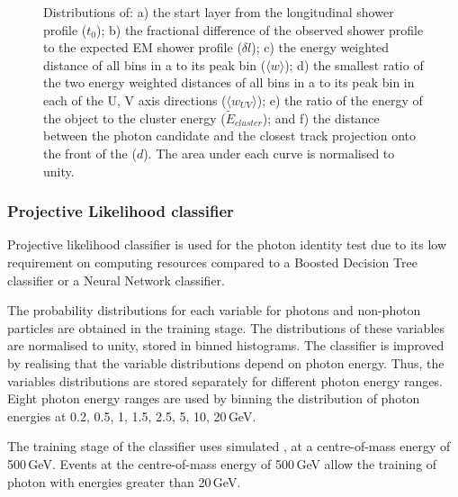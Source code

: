 \begin{figure}[tbph]
\caption
{Distributions of: a) the start layer from the longitudinal shower profile ($t_0$); b)  the fractional difference of the observed shower profile to the expected EM shower profile ($\delta{l}$); c) the energy weighted \rms distance of all bins in a \ShowerPeak to its peak bin ($\langle{w}\rangle$); d)   the smallest ratio of the two energy weighted \rms distances of all bins in a \ShowerPeak to its peak bin in each of the U, V axis directions (${\langle{w_{UV}}\rangle}$); e)  the  ratio of the energy of the \ShowerPeak object to the cluster energy ($\tilde{E}_{cluster}$); and f) the distance between the photon candidate and the closest track projection onto the front of the \ECAL ($d$). The area under each curve is normalised to unity.}
\label{fig:photonVarLikelihood}
\end{figure}



\subsubsection{Projective Likelihood classifier}


Projective likelihood classifier   is used  for the photon identity test due to its  low requirement on computing resources compared to a Boosted Decision Tree classifier or a Neural Network classifier.

The probability distributions for each variable for photons and non-photon particles are obtained in the training stage. The distributions of these variables are normalised to unity, stored in binned histograms. The classifier is improved by realising that the variable distributions depend on photon energy. Thus, the variables distributions are stored separately for different photon energy ranges. Eight photon energy ranges are used by binning the distribution of photon energies at 0.2, 0.5, 1, 1.5, 2.5, 5, 10, 20\,GeV.


The training stage of the classifier uses simulated  \eeZuds, at a centre-of-mass energy of 500\,GeV. Events at the centre-of-mass energy of 500\,GeV allow the training of photon with energies greater than 20\,GeV.


